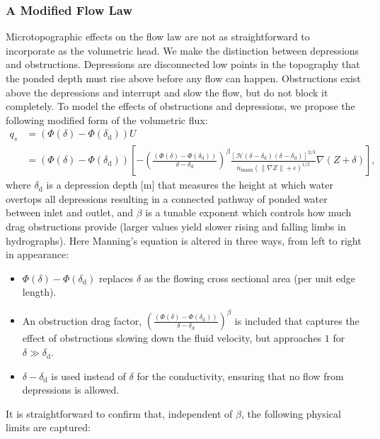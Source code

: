 \documentclass[review,11pt]{elsarticle}
\begin{document}
\subsubsection{A Modified Flow Law}
Microtopographic effects on the flow law are not as straightforward to incorporate as the volumetric head.
We make the distinction between depressions and obstructions.
Depressions are disconnected low points in the topography that the ponded depth must rise above before any flow can happen.
Obstructions exist above the depressions and interrupt and slow the flow, but do not block it completely.
To model the effects of obstructions and depressions, we propose the following modified form of the volumetric flux:
%
\begin{align}
\label{modified-velocity}
q_s &= \left( \Phi(\delta) - \Phi(\delta_\text{d}) \right) U \nonumber \\
    &= \left( \Phi(\delta) - \Phi(\delta_\text{d}) \right)\left[- \left(\frac{\left( \Phi(\delta) - \Phi(\delta_\text{d}) \right)}{\delta - \delta_\text{d}}\right)^\beta \frac{ \left[ \mathcal{H} \left( \delta - \delta_\text{d}\right )\left(\delta - \delta_\text{d}\right)\right]^{2/3} }{n_\text{mann} (\| \nabla Z \| +\epsilon)^{1/2}} \nabla(Z + \delta) \right],
\end{align}
%
where $\delta_\text{d}$ is a depression depth [m] that measures the height at which water overtops all depressions resulting in a connected pathway of ponded water between inlet and outlet, and $\beta$ is a tunable exponent which controls how much drag obstructions provide (larger values yield slower rising and falling limbs in hydrographs).
Here Manning's equation is altered in three ways, from left to right in appearance:
%
\begin{itemize}
\item $\Phi(\delta) - \Phi(\delta_\text{d})$ replaces $\delta$ as the flowing cross sectional area (per unit edge length).
\item An obstruction drag factor, $\left(\frac{\left( \Phi(\delta) - \Phi(\delta_\text{d}) \right)}{\delta - \delta_\text{d}}\right)^\beta$ is included that captures the effect of obstructions slowing down the fluid velocity, but approaches $1$ for $\delta \gg \delta_\text{d}$.
\item $\delta - \delta_\text{d}$ is used instead of $\delta$ for the conductivity, ensuring that no flow from depressions is allowed.
\end{itemize}
%
It is straightforward to confirm that, independent of $\beta$, the following physical limits are captured:
\end{document}
